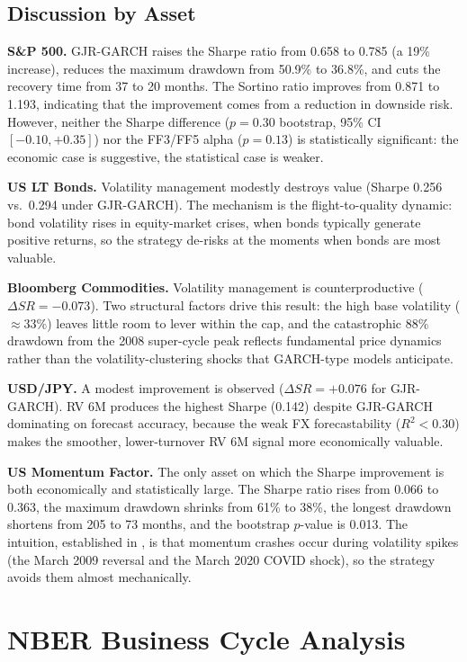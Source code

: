 \documentclass[12pt, a4paper]{article}
\begin{document}
\subsection{Discussion by Asset}

\textbf{S\&P 500.} GJR-GARCH raises the Sharpe ratio from 0.658 to 0.785 (a 19\% increase),
reduces the maximum drawdown from 50.9\% to 36.8\%, and cuts the recovery time from 37 to
20 months. The Sortino ratio improves from 0.871 to 1.193, indicating that the improvement
comes from a reduction in downside risk. However, neither the Sharpe difference
($p=0.30$ bootstrap, 95\% CI $[-0.10,+0.35]$) nor the FF3/FF5 alpha ($p=0.13$) is statistically
significant: the economic case is suggestive, the statistical case is weaker.

\textbf{US LT Bonds.} Volatility management modestly destroys value (Sharpe 0.256 vs.\ 0.294
under GJR-GARCH). The mechanism is the flight-to-quality dynamic: bond volatility rises in
equity-market crises, when bonds typically generate positive returns, so the strategy
de-risks at the moments when bonds are most valuable.

\textbf{Bloomberg Commodities.} Volatility management is counterproductive
($\Delta SR=-0.073$). Two structural factors drive this result: the high base volatility
($\approx 33\%$) leaves little room to lever within the cap, and the catastrophic 88\%
drawdown from the 2008 super-cycle peak reflects fundamental price dynamics rather than
the volatility-clustering shocks that GARCH-type models anticipate.

\textbf{USD/JPY.} A modest improvement is observed ($\Delta SR=+0.076$ for GJR-GARCH).
RV 6M produces the highest Sharpe (0.142) despite GJR-GARCH dominating on forecast
accuracy, because the weak FX forecastability ($R^2<0.30$) makes the smoother,
lower-turnover RV 6M signal more economically valuable.

\textbf{US Momentum Factor.} The only asset on which the Sharpe improvement is both
economically and statistically large. The Sharpe ratio rises from 0.066 to 0.363, the
maximum drawdown shrinks from 61\% to 38\%, the longest drawdown shortens from 205 to 73
months, and the bootstrap $p$-value is 0.013. The intuition, established in
\citet{moreira2017}, is that momentum crashes occur during volatility spikes (the March
2009 reversal and the March 2020 COVID shock), so the strategy avoids them almost
mechanically.

\section{NBER Business Cycle Analysis}
\end{document}
